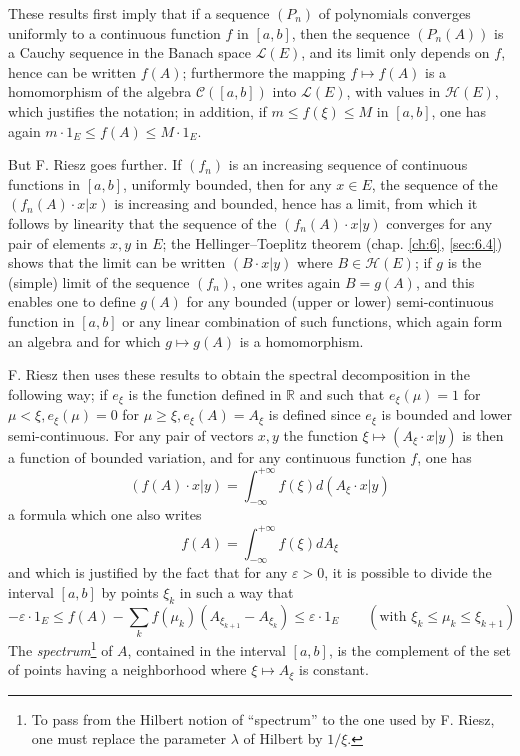 \documentclass[12pt,a4paper,leqno,twoside]{extbook}
\newcommand{\Cont}{\mathcal{C}}
\newcommand{\R}{\mathbb{R}}
\begin{document}
These results first imply that if a sequence \((P_n)\) of polynomials converges uniformly to a continuous function \(f\) in \([a,b]\), then the sequence \((P_n(A))\) is a Cauchy sequence in the Banach space \(\mathcal{L}(E)\), and its limit only depends on \(f\), hence can be written \(f(A)\); furthermore the mapping \(f \mapsto f(A)\) is a homomorphism of the algebra \(\Cont([a,b])\) into \(\mathcal{L}(E)\), with values in \(\mathcal{H}(E)\), which justifies the notation; in addition, if \(m \leq f(\xi) \leq M\) in \([a,b]\), one has again \(m \cdot 1_E \leq f(A) \leq M \cdot 1_E\).

But F. Riesz goes further. If \((f_n)\) is an increasing sequence of continuous functions in \([a,b]\), uniformly bounded, then for any \(x \in E\), the sequence of the \((f_n(A) \cdot x|x)\) is increasing and bounded, hence has a limit, from which it follows by linearity that the sequence of the \((f_n(A) \cdot x|y)\) converges for any pair of elements \(x, y\) in \(E\); the Hellinger--Toeplitz theorem (chap. \ref{ch:6}, \ref{sec:6.4}) shows that the limit can be written \((B \cdot x|y)\) where \(B \in \mathcal{H}(E)\); if \(g\) is the (simple) limit of the sequence \((f_n)\), one writes again \(B = g(A)\), and this enables one to define \(g(A)\) for any bounded (upper or lower) semi-continuous function in \([a,b]\) or any linear combination of such functions, which again form an algebra and for which \(g \mapsto g(A)\) is a homomorphism.

F. Riesz then uses these results to obtain the spectral decomposition in the following way; if \(e_\xi\) is the function defined in \(\R\) and such that \(e_\xi(\mu) = 1\) for \(\mu < \xi, e_\xi(\mu) = 0\) for \(\mu \geq \xi, e_\xi(A) = A_\xi\) is defined since \(e_\xi\) is bounded and lower semi-continuous. For any pair of vectors \(x, y\) the function \(\xi \mapsto (A_\xi \cdot x|y)\) is then a function of bounded variation, and for any continuous function \(f\), one has
\begin{equation}
    \label{eq:7.12}
    (f(A) \cdot x | y) = \int_{-\infty}^{+\infty} f(\xi)d(A_\xi \cdot x | y)
\end{equation}
a formula which one also writes
\begin{equation}
    \label{eq:7.13}
    f(A) = \int_{-\infty}^{+\infty} f(\xi)dA_\xi
\end{equation}
and which is justified by the fact that for any \(\varepsilon > 0\), it is possible to divide the interval \([a,b]\) by points \(\xi_k\) in such a way that
\[
    -\varepsilon \cdot 1_E \leq f(A) - \sum_k f(\mu_k)\left( A_{\xi_{k+1}} - A_{\xi_k} \right) \leq \varepsilon \cdot 1_E \qquad (\text{with } \xi_k \leq \mu_k \leq \xi_{k+1})
\]
The \emph{spectrum}\footnote{To pass from the Hilbert notion of ``spectrum'' to the one used by F. Riesz, one must replace the parameter \(\lambda\) of Hilbert by \(1/\xi\).} of \(A\), contained in the interval \([a,b]\), is the complement of the set of points having a neighborhood where \(\xi \mapsto A_\xi\) is constant.
\end{document}
